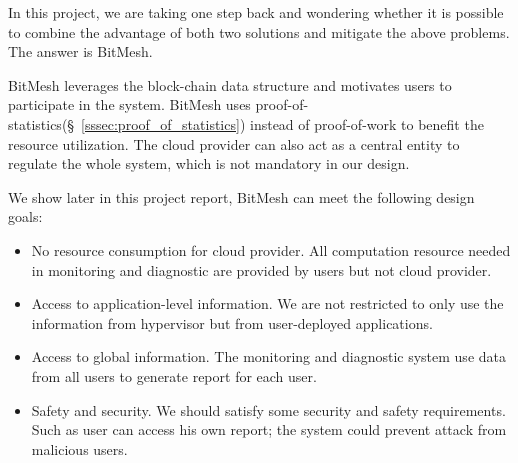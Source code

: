 \documentclass[11px]{article}
\newcommand{\projTitle}{BitMesh\xspace}
\begin{document}
In this project, we are taking one step back and wondering whether it is possible to combine the advantage of both two solutions and mitigate the above problems. The answer is \projTitle.

\projTitle leverages the block-chain data structure and motivates users to participate in the system. \projTitle uses proof-of-statistics(\S~\ref{sssec:proof_of_statistics}) instead of proof-of-work to benefit the resource utilization. The cloud provider can also act as a central entity to regulate the whole system, which is not mandatory in our design.

We show later in this project report, \projTitle can meet the following design goals:

\begin{itemize}
  \item No resource consumption for cloud provider. All computation resource needed in monitoring and diagnostic are provided by users but not cloud provider.
  \item Access to application-level information. We are not restricted to only use the information from hypervisor but from user-deployed applications.
  \item Access to global information. The monitoring and diagnostic system use data from all users to generate report for each user.
  \item Safety and security. We should satisfy some security and safety requirements. Such as user can access his own report; the system could prevent attack from malicious users.
\end{itemize}
\end{document}

